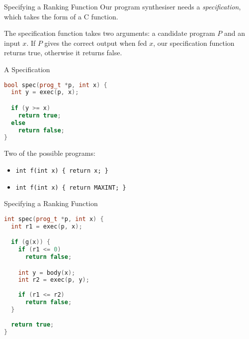 \documentclass[xcolor=pdftex,t,11pt]{beamer}
\begin{document}
\begin{frame}{Specifying a Ranking Function}
Our program synthesiser needs a \emph{specification}, which takes the form of a C function.

\vspace{1em}

The specification function takes two arguments: a candidate program $P$ and an input $x$.
If $P$ gives the correct output when fed $x$, our specification function returns true,
otherwise it returns false.
\end{frame}

\begin{frame}[fragile]{A Specification}

\vspace{-1em}

\begin{center}
\begin{minipage}{.6\textwidth}
\begin{lstlisting}[language=C++,basicstyle=\small]
bool spec(prog_t *p, int x) {
  int y = exec(p, x);

  if (y >= x)
    return true;
  else
    return false;
}
\end{lstlisting}
\end{minipage}
\end{center}

\pause

Two of the possible programs:

\begin{itemize}
  \item[] \texttt{int f(int x) \{ return x; \}} 
  \item[] \texttt{int f(int x) \{ return MAXINT; \}}
\end{itemize}

\end{frame}

\begin{frame}[fragile]{Specifying a Ranking Function}
\vspace{-1em}

\begin{center}
\begin{minipage}{0.6\textwidth}
\begin{lstlisting}[language=c++,basicstyle=\small]
int spec(prog_t *p, int x) {
  int r1 = exec(p, x);

  if (g(x)) {
    if (r1 <= 0)
      return false;

    int y = body(x);
    int r2 = exec(p, y);
    
    if (r1 <= r2)
      return false;
  }
  
  return true;
}
\end{lstlisting}
\end{minipage}
\end{center}
\end{frame}
\end{document}
